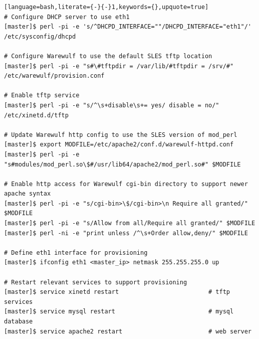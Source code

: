 \documentclass[letterpaper]{article}
\begin{document}
\begin{lstlisting}[language=bash,literate={-}{-}1,keywords={},upquote=true]
# Configure DHCP server to use eth1
[master]$ perl -pi -e 's/^DHCPD_INTERFACE=""/DHCPD_INTERFACE="eth1"/' /etc/sysconfig/dhcpd

# Configure Warewulf to use the default SLES tftp location
[master]$ perl -pi -e "s#\#tftpdir = /var/lib/#tftpdir = /srv/#" /etc/warewulf/provision.conf

# Enable tftp service
[master]$ perl -pi -e "s/^\s+disable\s+= yes/ disable = no/" /etc/xinetd.d/tftp

# Update Warewulf http config to use the SLES version of mod_perl
[master]$ export MODFILE=/etc/apache2/conf.d/warewulf-httpd.conf
[master]$ perl -pi -e "s#modules/mod_perl.so\$#/usr/lib64/apache2/mod_perl.so#" $MODFILE

# Enable http access for Warewulf cgi-bin directory to support newer apache syntax
[master]$ perl -pi -e "s/cgi-bin>\$/cgi-bin>\n Require all granted/" $MODFILE
[master]$ perl -pi -e "s/Allow from all/Require all granted/" $MODFILE
[master]$ perl -ni -e "print unless /^\s+Order allow,deny/" $MODFILE

# Define eth1 interface for provisioning
[master]$ ifconfig eth1 <master_ip> netmask 255.255.255.0 up

# Restart relevant services to support provisioning
[master]$ service xinetd restart                         # tftp services
[master]$ service mysql restart                          # mysql database
[master]$ service apache2 restart                        # web server
\end{lstlisting}

\end{document}
